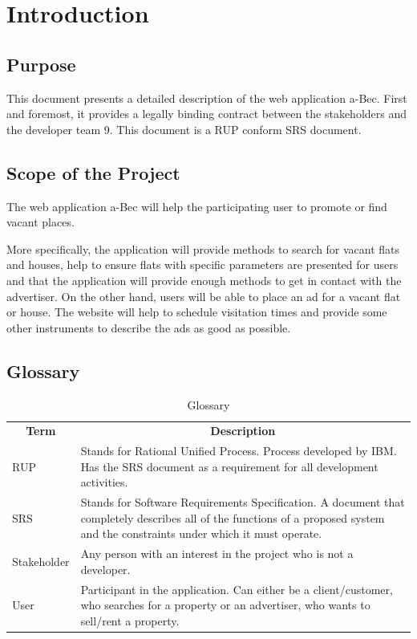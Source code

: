\section{Introduction}

\subsection{Purpose}
This document presents a detailed description of the web application a-Bec.
First and foremost, it provides a legally binding contract between the
stakeholders and the developer team 9. This document is a RUP conform SRS document.

\subsection{Scope of the Project}
The web application a-Bec will help the participating user to promote or
find vacant places.

More specifically, the application will provide methods to search for vacant
flats and houses, help to ensure flats with specific parameters are presented for users and
that the application will provide enough methods to get in contact with the
advertiser. On the other hand, users will be able to place an ad for a vacant
flat or house. The website will help to schedule visitation times and provide some other instruments to describe
the ads as good as possible.

\subsection{Glossary}

\begin{table}[H]
	\centering
	\begin{tabular}{p{3cm}p{9cm}}
	\multicolumn{1}{c}{\textbf{Term}} & \multicolumn{1}{c}{\textbf{Description}} \\

RUP & Stands for Rational Unified Process. Process developed by IBM. Has the SRS document as a requirement for all development activities. \\
SRS & Stands for Software Requirements Specification. A document that completely describes all of the functions of a proposed system and the constraints under which it must operate. \\
Stakeholder & Any person with an interest in the project who is not a developer. \\
User & Participant in the application. Can either be a client/customer, who searches
for a property or an advertiser, who wants to sell/rent a property.
	\end{tabular}
	\caption{Glossary}
	\label{table-glossary}
\end{table}


